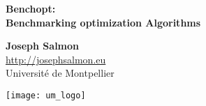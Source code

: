 \documentclass[unknownkeysallowed]{beamer}
\begin{document}


\begin{frame}
\bigskip
\bigskip
\begin{center}{
\LARGE\color{marron}
\textbf{Benchopt:\\
		Benchmarking optimization Algorithms}
\textbf{ }\\
\vspace{0.5cm}
}

\color{marron}
\end{center}

\vspace{0.5cm}

\begin{center}
\textbf{Joseph Salmon} \\
\vspace{0.1cm}
\url{http://josephsalmon.eu}\\
\vspace{0.5cm}
Université de Montpellier \\
\end{center}

\centering
\texttt{[image: um\_logo]}

\end{frame}







\end{document}
